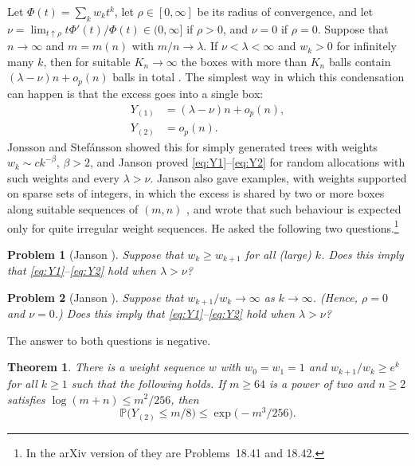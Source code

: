 \documentclass[11pt]{amsart}
\newtheorem{theorem}{Theorem}[section]
\newtheorem*{problem*}{Problem}
\theoremstyle{remark}
\numberwithin{equation}{section}
\newcommand{\Pp}{\mathbb P}
\begin{document}
Let $\Phi(t)=\sum_kw_kt^k$, let $\rho\in[0,\infty]$ be its radius of convergence, and let $\nu=\lim_{t\uparrow\rho}t\Phi'(t)/\Phi(t)\in(0,\infty]$ if $\rho>0$, and $\nu=0$ if $\rho=0$. Suppose that $n\to\infty$ and $m=m(n)$ with $m/n\to\lambda$. If $\nu<\lambda<\infty$ and $w_k>0$ for infinitely many $k$, then for suitable $K_n\to\infty$ the boxes with more than $K_n$ balls contain $(\lambda-\nu)n+o_p(n)$ balls in total \cite[Lemma~19.32]{J12}. The simplest way in which this condensation can happen is that the excess goes into a single box:
\begin{align}
Y_{(1)}&=(\lambda-\nu)n+o_p(n),\label{eq:Y1}\\
Y_{(2)}&=o_p(n).\label{eq:Y2}
\end{align}
Jonsson and Stef\'ansson \cite{JS11} showed this for simply generated trees with weights $w_k\sim ck^{-\beta}$, $\beta>2$, and Janson \cite[Theorem~19.34]{J12} proved \eqref{eq:Y1}--\eqref{eq:Y2} for random allocations with such weights and every $\lambda>\nu$. Janson also gave examples, with weights supported on sparse sets of integers, in which the excess is shared by two or more boxes along suitable sequences of $(m,n)$ \cite[Examples~19.37 and 19.38]{J12}, and wrote that such behaviour is expected only for quite irregular weight sequences. He asked the following two questions.\footnote{In the arXiv version of \cite{J12} they are Problems~18.41 and 18.42.}

\begin{problem*}[{Janson \cite[Problem~19.42]{J12}}]
Suppose that $w_k\ge w_{k+1}$ for all (large) $k$. Does this imply that \eqref{eq:Y1}--\eqref{eq:Y2} hold when $\lambda>\nu$?
\end{problem*}

\begin{problem*}[{Janson \cite[Problem~19.43]{J12}}]
Suppose that $w_{k+1}/w_k\to\infty$ as $k\to\infty$. (Hence, $\rho=0$ and $\nu=0$.) Does this imply that \eqref{eq:Y1}--\eqref{eq:Y2} hold when $\lambda>\nu$?
\end{problem*}

The answer to both questions is negative.

\begin{theorem}\label{thm:ratio}
There is a weight sequence $w$ with $w_0=w_1=1$ and $w_{k+1}/w_k\ge e^k$ for all $k\ge1$ such that the following holds. If $m\ge64$ is a power of two and $n\ge2$ satisfies $\log(m+n)\le m^2/256$, then
\[
\Pp\bigl(Y_{(2)}\le m/8\bigr)\le\exp\bigl(-m^3/256\bigr).
\]
\end{theorem}
\end{document}
